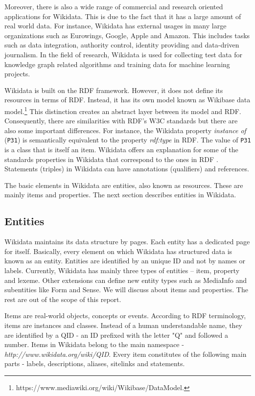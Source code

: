 Moreover, there is also a wide range of commercial and research oriented applications for Wikidata. This is due to the fact that it has a large amount of real world data. For instance, Wikidata has external usages in many large organizations such as Eurowings, Google, Apple and Amazon. This includes tasks such as data integration, authority control, identity providing and data-driven journalism. In the field of research, Wikidata is used for collecting test data for knowledge graph related algorithms and training data for machine learning projects.

Wikidata is built on the RDF framework. However, it does not define its resources in terms of RDF. Instead, it has its own model known as Wikibase data model.\footnote{https://www.mediawiki.org/wiki/Wikibase/DataModel.} This distinction creates an abstract layer between its model and RDF. Consequently, there are similarities with RDF’s W3C standards but there are also some important differences. For instance, the Wikidata property \textit{instance of} (\texttt{P31}) is semantically equivalent to the property \textit{rdf:type} in RDF. The value of \texttt{P31} is a class that is itself an item. Wikidata offers an explanation for some of the standards properties in Wikidata that correspond to the ones in RDF \cite{Foundation}. Statements (triples) in Wikidata can have annotations (qualifiers) and references.

The basic elements in Wikidata are entities, also known as resources. These are mainly items and properties. The next section describes entities in Wikidata. 

\subsection{Entities}
Wikidata maintains its data structure by pages. Each entity has a dedicated page for itself. Basically, every element on which Wikidata has structured data is known as an entity\cite{Erxleben2014}. Entities are identified by an unique ID and not by names or labels. Currently, Wikidata has mainly three types of entities – item, property and lexeme. Other extensions can define new entity types such as MediaInfo and subentities like Form and Sense. We will discuss about items and properties. The rest are out of the scope of this report.

Items are real-world objects, concepts or events. According to RDF terminology, items are instances and classes. Instead of a human understandable name, they are identified by a QID - an ID prefixed with the letter "Q" and followed a number. Items in Wikidata belong to the main namespace - \textit{http://www.wikidata.org/wiki/QID}. Every item constitutes of the following main parts - labels, descriptions, aliases, sitelinks and statements\cite{Erxleben2014}.

